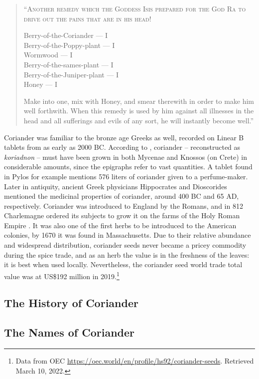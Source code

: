 \begin{quote}
\textsc{``Another remedy which the Goddess Isis prepared for the God Ra to drive out the pains that are in his head!}

\smallskip
Berry-of-the-Coriander --- I\\
Berry-of-the-Poppy-plant --- I\\
Wormwood --- I\\
Berry-of-the-sames-plant --- I\\
Berry-of-the-Juniper-plant --- I\\
Honey --- I
\smallskip

Make into one, mix with Honey, and smear therewith in order to make him well forthwith. When this remedy is used by him against all illnesses in the head and all sufferings and evils of any sort, he will instantly become well.'' \textcite[40]{bryan_papyrus_1930}
\end{quote}

Coriander was familiar to the bronze age Greeks as well, recorded on Linear B tablets from as early as 2000 BC. According to \textcite{chadwick_mycenaean_1976}, coriander -- reconstructed as \textit{koriadnon} -- must have been grown in both Mycenae and Knossos (on Crete) in considerable amounts, since the epigraphs refer to vast quantities. A tablet found in Pylos for example mentions 576 liters of coriander given to a perfume-maker. Later in antiquity, ancient Greek physicians Hippocrates and Dioscorides mentioned the medicinal properties of coriander, around 400 BC and 65 AD, respectively. Coriander was introduced to England by the Romans, and in 812 Charlemagne ordered its subjects to grow it on the farms of the Holy Roman Empire \parencite{prance_cultural_2005}. It was also one of the first herbs to be introduced to the American colonies, by 1670 it was found in Massachusetts. Due to their relative abundance and widespread distribution, coriander seeds never became a pricey commodity during the spice trade, and as an herb the value is in the freshness of the leaves: it is best when used locally. Nevertheless, the coriander seed world trade total value was at US\$192 million in 2019.\footnote{Data from OEC \url{https://oec.world/en/profile/hs92/coriander-seeds}. Retrieved March 10, 2022.}

\subsection{The History of Coriander}

\subsection{The Names of Coriander}

